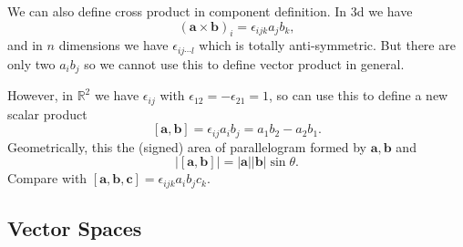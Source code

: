 \documentclass[a4paper]{article}
\begin{document}
We can also define cross product in component definition. In 3d we have
\[
  (\mathbf{a}\times \mathbf{b})_i=\epsilon_{ijk}a_jb_k
,\]
and in $n$ dimensions we have $\epsilon_{ij\cdots l}$ which is
totally anti-symmetric. But there are only two $a_ib_j$ so we cannot
use this to define vector product in general.

However, in $ \mathbb{R}^2 $ we have $ \epsilon_{ij} $ with $
\epsilon_{12}=-\epsilon_{21}=1 $, so can use this to define a new scalar product
\[
  [\mathbf{a},\mathbf{b}]=\epsilon_{ij}a_ib_j=a_1b_2-a_2b_1
.\]
Geometrically, this the (signed) area of parallelogram formed by $
\mathbf{a},\mathbf{b} $ and
\[
  |[\mathbf{a},\mathbf{b}]|=|\mathbf{a}||\mathbf{b}|\sin \theta
.\]
Compare with $ [\mathbf{a},\mathbf{b},\mathbf{c}]=\epsilon_{ijk}a_ib_jc_k $.
\subsection{Vector Spaces}
\end{document}
